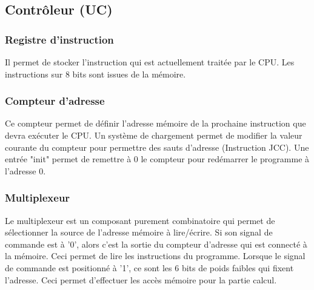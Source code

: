 \documentclass{article}
\begin{document}
    \subsection{Contrôleur (UC)}
    \subsubsection{Registre d'instruction}
    \par Il permet de stocker l'instruction qui est actuellement traitée par le CPU. Les instructions sur 8 bits sont issues de la mémoire. 
    \subsubsection{Compteur d'adresse}
    \par Ce compteur permet de définir l'adresse mémoire de la prochaine instruction que devra exécuter le CPU. Un système de chargement permet de modifier la valeur courante du compteur pour permettre des sauts d'adresse (Instruction JCC). Une entrée "init" permet de remettre à 0 le compteur pour redémarrer le programme à l'adresse 0.
    \subsubsection{Multiplexeur}
    \par Le multiplexeur est un composant purement combinatoire qui permet de sélectionner la source de l'adresse mémoire à lire/écrire. Si son signal de commande est à '0', alors c'est la sortie du compteur d'adresse qui est connecté à la mémoire. Ceci permet de lire les instructions du programme. Lorsque le signal de commande est positionné à '1', ce sont les 6 bits de poids faibles qui fixent l'adresse. Ceci permet d'effectuer les accès mémoire pour la partie calcul. 
\end{document}
